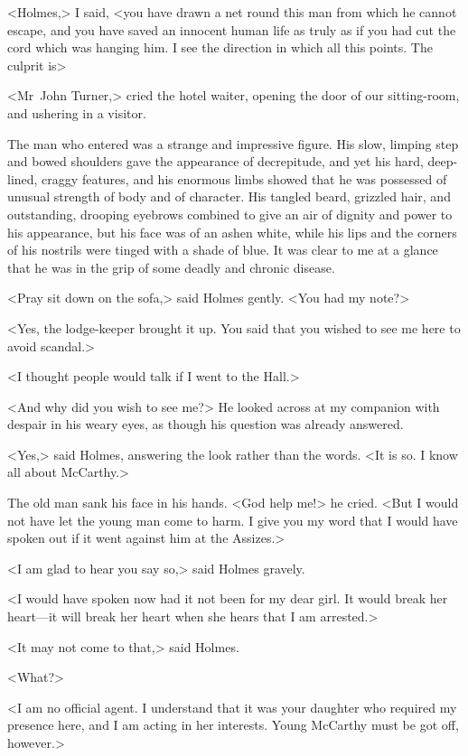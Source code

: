 <Holmes,> I said, <you have drawn a net round this man from which he cannot escape, and you have saved an innocent human life as truly as if you had cut the cord which was hanging him. I see the direction in which all this points. The culprit is\longdash>

<Mr~John Turner,> cried the hotel waiter, opening the door of our sitting-room, and ushering in a visitor.

The man who entered was a strange and impressive figure. His slow, limping step and bowed shoulders gave the appearance of decrepitude, and yet his hard, deep-lined, craggy features, and his enormous limbs showed that he was possessed of unusual strength of body and of character. His tangled beard, grizzled hair, and outstanding, drooping eyebrows combined to give an air of dignity and power to his appearance, but his face was of an ashen white, while his lips and the corners of his nostrils were tinged with a shade of blue. It was clear to me at a glance that he was in the grip of some deadly and chronic disease.

<Pray sit down on the sofa,> said Holmes gently. <You had my note?>

<Yes, the lodge-keeper brought it up. You said that you wished to see me here to avoid scandal.>

<I thought people would talk if I went to the Hall.>

<And why did you wish to see me?> He looked across at my companion with despair in his weary eyes, as though his question was already answered.

<Yes,> said Holmes, answering the look rather than the words. <It is so. I know all about McCarthy.>

The old man sank his face in his hands. <God help me!> he cried. <But I would not have let the young man come to harm. I give you my word that I would have spoken out if it went against him at the Assizes.>

<I am glad to hear you say so,> said Holmes gravely.

<I would have spoken now had it not been for my dear girl. It would break her heart—it will break her heart when she hears that I am arrested.>

<It may not come to that,> said Holmes.

<What?>

<I am no official agent. I understand that it was your daughter who required my presence here, and I am acting in her interests. Young McCarthy must be got off, however.>

